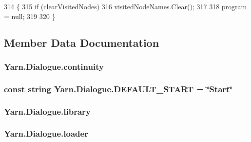 \begin{DoxyCode}
314                                                              \{
315             \textcolor{keywordflow}{if} (clearVisitedNodes)
316                 visitedNodeNames.Clear();
317 
318             \hyperlink{a00036_a0a1cca92325f430425d784d416cb5c2b}{program} = null;
319 
320         \}
\end{DoxyCode}


\subsection{Member Data Documentation}
\hypertarget{a00036_ae94eaa4b03b432422f5d205fabe37ff5}{
\subsubsection[{continuity}]{ Yarn.\-Dialogue.\-continuity\hspace{0.3cm}{\ttfamily [package]}}}\label{a00036_ae94eaa4b03b432422f5d205fabe37ff5}
\hypertarget{a00036_a1b643f15f734090e6a58cbf13dafd28f}{
\subsubsection[{D\-E\-F\-A\-U\-L\-T\-\_\-\-S\-T\-A\-R\-T}]{\setlength{\rightskip}{0pt plus 5cm}const string Yarn.\-Dialogue.\-D\-E\-F\-A\-U\-L\-T\-\_\-\-S\-T\-A\-R\-T = \char`\"{}Start\char`\"{}}}\label{a00036_a1b643f15f734090e6a58cbf13dafd28f}
\hypertarget{a00036_ae660d4cfb6e296358d2f61d8ee74c66a}{
\subsubsection[{library}]{ Yarn.\-Dialogue.\-library}}\label{a00036_ae660d4cfb6e296358d2f61d8ee74c66a}
\hypertarget{a00036_a98bbe0ac2ccadeeeb7e05e3e6e19f2e0}{
\subsubsection[{loader}]{ Yarn.\-Dialogue.\-loader\hspace{0.3cm}{\ttfamily [private]}}}\label{a00036_a98bbe0ac2ccadeeeb7e05e3e6e19f2e0}
